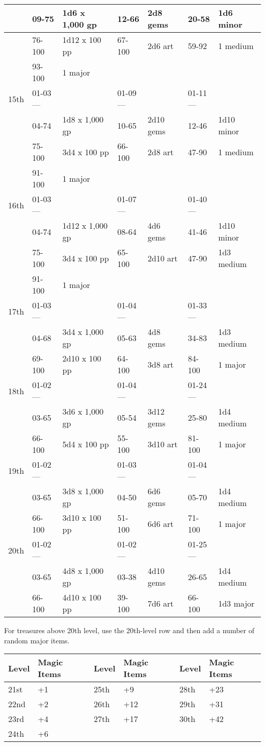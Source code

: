 \documentclass{article}
\begin{document}
\begin{tabular}{|>{\raggedright}p{21pt}|>{\raggedright}p{28pt}|>{\raggedright}p{66pt}|>{\raggedright}p{28pt}|>{\raggedright}p{41pt}|>{\raggedright}p{28pt}|>{\raggedright}p{51pt}|}
\hline
 & 09-75 & 1d6 x 1,000 gp & 12-66 & 2d8 gems & 20-58 & 1d6 minor\tabularnewline
\hline
 & 76-100 & 1d12 x 100 pp & 67-100 & 2d6 art & 59-92 & 1 medium\tabularnewline
\hline
 & 93-100 & 1 major &  &  &  & \tabularnewline
\hline
15th & 01-03--- &  & 01-09--- &  & 01-11--- & \tabularnewline
\hline
 & 04-74 & 1d8 x 1,000 gp & 10-65 & 2d10 gems & 12-46 & 1d10 minor\tabularnewline
\hline
 & 75-100 & 3d4 x 100 pp & 66-100 & 2d8 art & 47-90 & 1 medium\tabularnewline
\hline
 & 91-100 & 1 major &  &  &  & \tabularnewline
\hline
16th & 01-03--- &  & 01-07--- &  & 01-40--- & \tabularnewline
\hline
 & 04-74 & 1d12 x 1,000 gp & 08-64 & 4d6 gems & 41-46 & 1d10 minor\tabularnewline
\hline
 & 75-100 & 3d4 x 100 pp & 65-100 & 2d10 art & 47-90 & 1d3 medium\tabularnewline
\hline
 & 91-100 & 1 major &  &  &  & \tabularnewline
\hline
17th & 01-03--- &  & 01-04--- &  & 01-33--- & \tabularnewline
\hline
 & 04-68 & 3d4 x 1,000 gp & 05-63 & 4d8 gems & 34-83 & 1d3 medium\tabularnewline
\hline
 & 69-100 & 2d10 x 100 pp & 64-100 & 3d8 art & 84-100 & 1 major\tabularnewline
\hline
18th & 01-02--- &  & 01-04--- &  & 01-24--- & \tabularnewline
\hline
 & 03-65 & 3d6 x 1,000 gp & 05-54 & 3d12 gems & 25-80 & 1d4 medium\tabularnewline
\hline
 & 66-100 & 5d4 x 100 pp & 55-100 & 3d10 art & 81-100 & 1 major\tabularnewline
\hline
19th & 01-02--- &  & 01-03--- &  & 01-04--- & \tabularnewline
\hline
 & 03-65 & 3d8 x 1,000 gp & 04-50 & 6d6 gems & 05-70 & 1d4 medium\tabularnewline
\hline
 & 66-100 & 3d10 x 100 pp & 51-100 & 6d6 art & 71-100 & 1 major\tabularnewline
\hline
20th & 01-02--- &  & 01-02--- &  & 01-25--- & \tabularnewline
\hline
 & 03-65 & 4d8 x 1,000 gp & 03-38 & 4d10 gems & 26-65 & 1d4 medium\tabularnewline
\hline
 & 66-100 & 4d10 x 100 pp & 39-100 & 7d6 art & 66-100 & 1d3 major\tabularnewline
\hline
\end{tabular}

\vspace{12pt}
For treasures above 20th level, use the 20th-level row and then add a number of 
random major items.

\vspace{12pt}
\begin{tabular}{|>{\raggedright}p{22pt}|>{\raggedright}p{51pt}|>{\raggedright}p{22pt}|>{\raggedright}p{51pt}|>{\raggedright}p{22pt}|>{\raggedright}p{51pt}|}
\hline
L\textbf{evel} & M\textbf{agic Items} & L\textbf{evel} & M\textbf{agic Items} & L\textbf{evel} & M\textbf{agic 
Items}\tabularnewline
\hline
21st & +1 & 25th & +9 & 28th & +23\tabularnewline
\hline
22nd & +2 & 26th & +12 & 29th & +31\tabularnewline
\hline
23rd & +4 & 27th & +17 & 30th & +42\tabularnewline
\hline
24th & +6 &  &  &  & \tabularnewline
\hline
\end{tabular}
\end{document}
